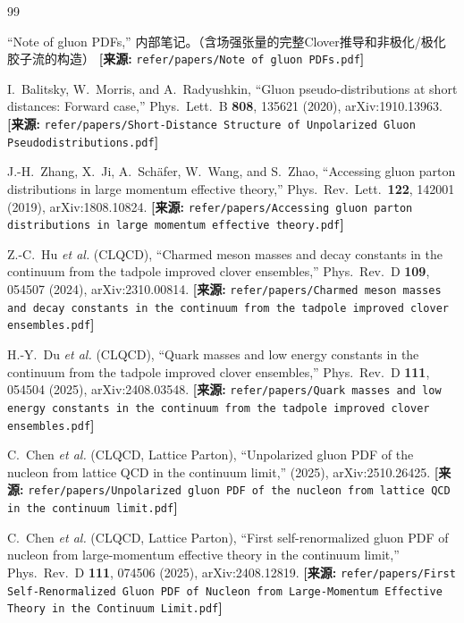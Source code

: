 \documentclass[12pt,a4paper]{ctexart}
\theoremstyle{definition}
\begin{document}
\begin{thebibliography}{99}


``Note of gluon PDFs,''
内部笔记。（含场强张量的完整Clover推导和非极化/极化胶子流的构造）
\quad\textbf{[来源:} \texttt{refer/papers/Note of gluon PDFs.pdf}\textbf{]}

I.~Balitsky, W.~Morris, and A.~Radyushkin,
``Gluon pseudo-distributions at short distances: Forward case,''
Phys.\ Lett.\ B \textbf{808}, 135621 (2020), arXiv:1910.13963.
\quad\textbf{[来源:} \texttt{refer/papers/Short-Distance Structure of Unpolarized Gluon Pseudodistributions.pdf}\textbf{]}

J.-H.~Zhang, X.~Ji, A.~Sch\"afer, W.~Wang, and S.~Zhao,
``Accessing gluon parton distributions in large momentum effective theory,''
Phys.\ Rev.\ Lett.\ \textbf{122}, 142001 (2019), arXiv:1808.10824.
\quad\textbf{[来源:} \texttt{refer/papers/Accessing gluon parton distributions in large momentum effective theory.pdf}\textbf{]}


Z.-C.~Hu \textit{et al.} (CLQCD),
``Charmed meson masses and decay constants in the continuum from the tadpole improved clover ensembles,''
Phys.\ Rev.\ D \textbf{109}, 054507 (2024), arXiv:2310.00814.
\quad\textbf{[来源:} \texttt{refer/papers/Charmed meson masses and decay constants in the continuum from the tadpole improved clover ensembles.pdf}\textbf{]}

H.-Y.~Du \textit{et al.} (CLQCD),
``Quark masses and low energy constants in the continuum from the tadpole improved clover ensembles,''
Phys.\ Rev.\ D \textbf{111}, 054504 (2025), arXiv:2408.03548.
\quad\textbf{[来源:} \texttt{refer/papers/Quark masses and low energy constants in the continuum from the tadpole improved clover ensembles.pdf}\textbf{]}


C.~Chen \textit{et al.} (CLQCD, Lattice Parton),
``Unpolarized gluon PDF of the nucleon from lattice QCD in the continuum limit,''
(2025), arXiv:2510.26425.
\quad\textbf{[来源:} \texttt{refer/papers/Unpolarized gluon PDF of the nucleon from lattice QCD in the continuum limit.pdf}\textbf{]}

C.~Chen \textit{et al.} (CLQCD, Lattice Parton),
``First self-renormalized gluon PDF of nucleon from large-momentum effective theory in the continuum limit,''
Phys.\ Rev.\ D \textbf{111}, 074506 (2025), arXiv:2408.12819.
\quad\textbf{[来源:} \texttt{refer/papers/First Self-Renormalized Gluon PDF of Nucleon from Large-Momentum Effective Theory in the Continuum Limit.pdf}\textbf{]}


\end{thebibliography}
\end{document}
